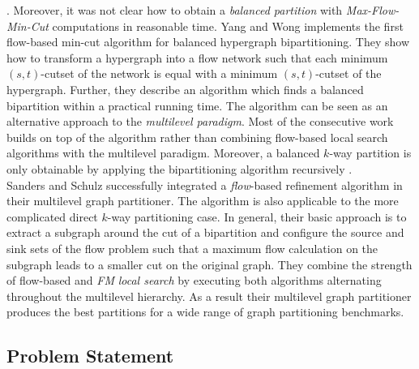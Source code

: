 \cite{liu1998network}. Moreover, it was not clear how to obtain a \emph{balanced partition}
with \emph{Max-Flow-Min-Cut} computations in reasonable time. Yang and Wong \cite{yang1996balanced}
implements the first flow-based min-cut algorithm for balanced hypergraph bipartitioning.
They show how to transform a hypergraph into a flow network such that each minimum $(s,t)$-cutset
of the network is equal with a minimum $(s,t)$-cutset of the hypergraph. Further, they describe
an algorithm which finds a balanced bipartition within a practical running time. The algorithm
can be seen as an alternative approach to the \emph{multilevel paradigm}. Most of the
consecutive work \cite{liu1998network,patkar2004efficient} builds on top of the algorithm
rather than combining flow-based local search algorithms with the multilevel paradigm. Moreover,
a balanced $k$-way partition is only obtainable by applying the bipartitioning algorithm
recursively \cite{yang1996balanced}.\\
Sanders and Schulz \cite{sanders2011engineering} successfully integrated a \emph{flow}-based refinement
algorithm in their multilevel graph partitioner. The algorithm is also applicable to the more
complicated direct $k$-way partitioning case. In general, their basic approach is to 
extract a subgraph around the cut of a bipartition and configure the source and sink sets
of the flow problem such that a maximum flow calculation on the subgraph leads to a 
smaller cut on the original graph. They combine the strength of flow-based and \emph{FM}
\emph{local search} by executing both algorithms alternating throughout the multilevel hierarchy.
As a result their multilevel graph partitioner produces the best partitions for 
a wide range of graph partitioning benchmarks. 

\subsection{Problem Statement}

